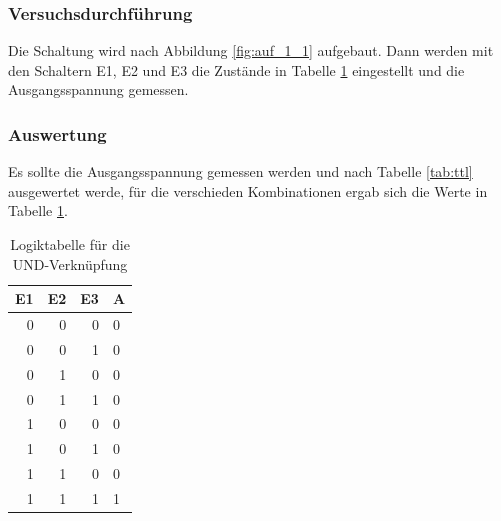 \documentclass[12pt,a4paper]{article}
\begin{document}
\subsubsection*{Versuchsdurchführung}

Die Schaltung wird nach Abbildung \ref{fig:auf_1_1} aufgebaut. Dann werden mit den Schaltern E1, E2 und E3 die Zustände in Tabelle \ref{tab:1_1} eingestellt und die Ausgangsspannung gemessen.
\subsubsection*{Auswertung}

Es sollte die Ausgangsspannung gemessen werden und nach Tabelle \ref{tab:ttl} ausgewertet werde, für die verschieden Kombinationen ergab sich die Werte in Tabelle \ref{tab:1_1}.

\begin{table}[H]
\begin{center}
\begin{tabular}{r|r|r|l}

\multicolumn{1}{l|}{E1} & \multicolumn{1}{l|}{E2} & \multicolumn{1}{l|}{E3} & A \\ \hline \hline
0 & 0 & 0 & 0 \\ 
0 & 0 & 1 & 0 \\ 
0 & 1 & 0 & 0 \\ 
0 & 1 & 1 & 0 \\ 
1 & 0 & 0 & 0 \\ 
1 & 0 & 1 & 0 \\ 
1 & 1 & 0 & 0 \\ 
1 & 1 & 1 & 1 \\ 
\end{tabular}
\end{center}
\caption{Logiktabelle für die UND-Verknüpfung}
\label{tab:1_1}
\end{table}
\end{document}
